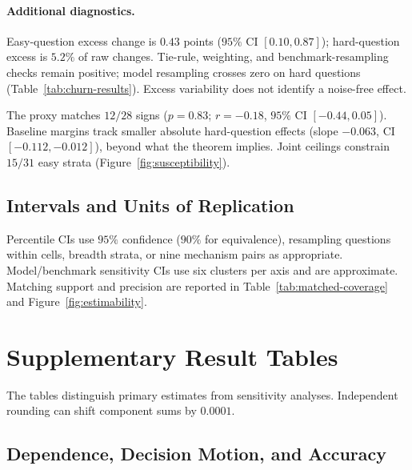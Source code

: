 \documentclass[11pt,a4paper]{article}
\theoremstyle{definition}
\begin{document}
\paragraph{Additional diagnostics.}
\label{sec:app-additional-diagnostics}
Easy-question excess change is $0.43$ points ($95\%$ CI $[0.10,0.87]$); hard-question excess is $5.2\%$ of raw changes. Tie-rule, weighting, and benchmark-resampling checks remain positive; model resampling crosses zero on hard questions (Table~\ref{tab:churn-results}). Excess variability does not identify a noise-free effect.

The proxy matches $12/28$ signs ($p=0.83$; $r=-0.18$, $95\%$ CI $[-0.44,0.05]$). Baseline margins track smaller absolute hard-question effects (slope $-0.063$, CI $[-0.112,-0.012]$), beyond what the theorem implies. Joint ceilings constrain $15/31$ easy strata (Figure~\ref{fig:susceptibility}).

\subsection{Intervals and Units of Replication}
\label{sec:app-est-ci}

Percentile CIs use $95\%$ confidence ($90\%$ for equivalence), resampling
questions within cells, breadth strata, or nine mechanism pairs as appropriate.
Model/benchmark sensitivity CIs use six clusters per axis and are approximate.
Matching support and precision are reported in
Table~\ref{tab:matched-coverage} and Figure~\ref{fig:estimability}.

\FloatBarrier
\section{Supplementary Result Tables}
\label{sec:app-result-tables}

The tables distinguish primary estimates from sensitivity analyses.
Independent rounding can shift component sums by $0.0001$.

\subsection{Dependence, Decision Motion, and Accuracy}
\label{sec:app-tab-breadth}
\end{document}
